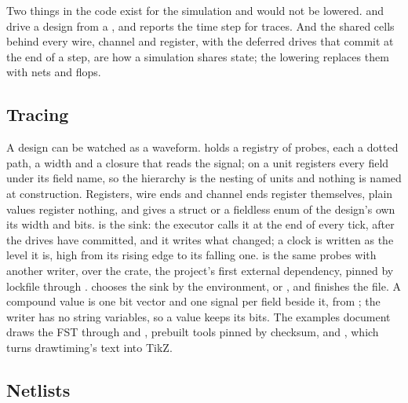 Two things in the code exist for the simulation and would not be
lowered.  and  drive a design from a
, and  reports the time step for traces. And the
shared cells behind every wire, channel and register, with the deferred
drives that commit at the end of a step, are how a simulation shares
state; the lowering replaces them with nets and flops.

\subsection{Tracing}

A design can be watched as a waveform.  holds a
registry of probes, each a dotted path, a width and a closure that
reads the signal;  on a unit registers every
field under its field name, so the hierarchy is the nesting of units
and nothing is named at construction. Registers, wire ends and channel
ends register themselves, plain values register nothing,
and  gives a struct or a fieldless enum of the
design's own its width and bits.  is the sink: the executor
calls it at the end of every tick, after the drives have committed,
and it writes what changed; a clock is written as the level it is,
high from its rising edge to its falling one.  is the
same probes with another writer, over the  crate,
the project's first external dependency, pinned by lockfile through
.  chooses the sink
by the environment,  or , and
 finishes the file. A compound value is one bit vector and
one signal per field beside it, from ; the writer
has no string variables, so a value keeps its bits.
The examples document draws the FST through  and
, prebuilt tools pinned by checksum, and
, which turns drawtiming's text into TikZ.

\subsection{Netlists}
\label{sec:r-lowering}


